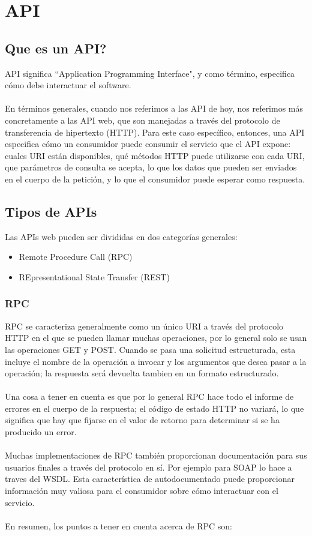 \chapter{API}
\label{capapi}

\section{Que es un API?}
API significa ``Application Programming Interface", y como término, especifica cómo debe interactuar el software.\\
\\
En términos generales, cuando nos referimos a las API de hoy, nos referimos más concretamente a las API web, que son manejadas a través del protocolo de transferencia de hipertexto (HTTP). Para este caso específico, entonces, una API especifica cómo un consumidor puede consumir el servicio que el API expone: cuales URI están disponibles, qué métodos HTTP puede utilizarse con cada URI, que parámetros de consulta se acepta, lo que los datos que pueden ser enviados en el cuerpo de la petición, y lo que el consumidor puede esperar como respuesta.

\section{Tipos de APIs}
Las APIs web pueden ser divididas en dos categorías generales:
\begin{itemize}
\item Remote Procedure Call (RPC)
\item REpresentational State Transfer (REST)
\end{itemize}

\subsection{RPC}
RPC se caracteriza generalmente como un único URI a través del protocolo HTTP en el que se pueden llamar muchas operaciones, por lo general solo se usan las operaciones GET y POST. Cuando se pasa una solicitud estructurada, esta incluye el nombre de la operación a invocar y los argumentos que desea pasar a la operación; la respuesta será devuelta tambien en un formato estructurado.\\
\\
Una cosa a tener en cuenta es que por lo general RPC hace todo el informe de errores en el cuerpo de la respuesta; el código de estado HTTP no variará, lo que significa que hay que fijarse en el valor de retorno para determinar si se ha producido un error.\\
\\
Muchas implementaciones de RPC también proporcionan documentación para sus usuarios finales a través del protocolo en sí. Por ejemplo para SOAP lo hace a traves del WSDL. Esta característica de autodocumentado puede proporcionar información muy valiosa para el consumidor sobre cómo interactuar con el servicio.\\
\\
En resumen, los puntos a tener en cuenta acerca de RPC son:

